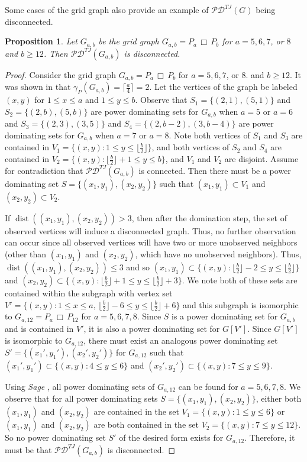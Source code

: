 \documentclass{article}
\def\red{\color{red}}
\numberwithin{figure}{section}   %
\newtheorem{prop}[thm]{Proposition}
\theoremstyle{definition}
\theoremstyle{definition}
\theoremstyle{definition}
\newcommand{\cp}{\, \Box\,}
\newcommand{\dist}{\operatorname{dist}}
\newcommand{\pd}{\gamma_P}
\newcommand{\te}{\mathscr{PD}^{TJ}}
\newcommand{\lh}[1]{{\textcolor{red}{[}\textcolor{red}{{LH: \em #1}]}}}
\begin{document}

Some cases of the grid graph also provide an example of $\te(G)$ being disconnected.

\begin{prop}
Let $G_{a,b}$ be the grid graph $G_{a,b}=P_{a}\cp P_{b}$ for $a=5,6,7$, or $8$ and $b\geq 12$. Then $\te(G_{a,b})$ is disconnected.
\end{prop}

\begin{proof} Consider the grid graph $G_{a,b}=P_{a}\cp P_{b}$ for $a=5,6,7$, or $8$.
and $b\ge 12$. It was shown in \cite{DH06} that $\pd(G_{a,b})=\lceil \frac{a}{4} \rceil=2$. Let the vertices of the graph be labeled $(x,y)$ for $1\leq x\leq a$ and $1\leq y\leq b$. Observe that $S_1=\{(2,1),(5,1)\}$ and $S_2=\{(2,b),(5,b)\}$ are power dominating sets for $G_{a,b}$ when $a=5$ or $a=6$ and $S_3=\{(2,3),(3,5)\}$ and $S_4=\{(2,b-2),(3,b-4)\}$ are power dominating sets for $G_{a,b}$ when $a=7$ or $a=8$. Note both vertices of $S_1$ and $S_3$ are contained in $V_1=\{(x,y) : 1\leq y\leq \lfloor \frac{b}{2}\rfloor\}$, and both vertices of $S_2$ and $S_4$ are contained in $V_2=\{(x,y) : \lfloor \frac{b}{2}\rfloor+1\leq y\leq b\}$, and $V_1$ and $V_2$ are disjoint. Assume for contradiction that $\te(G_{a,b})$ is connected. Then there must be a power dominating set $S=\{(x_1,y_1),(x_2,y_2)\}$ such that $(x_1,y_1)\subset V_1$ and $(x_2,y_2)\subset V_2$.

If $\dist((x_1,y_1),(x_2,y_2))>3$, then after the domination step, the set of observed vertices will induce a  disconnected graph. Thus, no further observation can occur since all observed vertices will have two or more unobserved neighbors (other than $(x_1,y_1)$ and $(x_2,y_2)$, which have no unobserved neighbors). Thus, $\dist((x_1,y_1),(x_2,y_2))\leq 3$ and so $(x_1,y_1)\subset \{(x,y) : \lfloor \frac{b}{2}\rfloor-2\leq y \leq \lfloor\frac{b}{2}\rfloor\}$ and $(x_2,y_2)\subset \{(x,y) : \lfloor \frac{b}{2}\rfloor+1\leq y \leq \lfloor\frac{b}{2}\rfloor+3\}$. We note both of these sets are contained within the subgraph with vertex set $V'=\{(x,y) : 1\leq x\leq a, \, \lfloor \frac{b}{2}\rfloor-6\leq y \leq \lfloor\frac{b}{2}\rfloor+6\}$ and this subgraph is isomorphic to $G_{a,12}=P_{a}\cp P_{12}$ for $a=5,6,7,8$. Since $S$ is a power dominating set for $G_{a,b}$ and is contained in $V'$, it is also a power dominating set for $G[V']$. Since $G[V']$ is isomorphic to $G_{a,12}$, there must exist an analogous power dominating set $S'=\{(x_1',y_1'),(x_2',y_2')\}$ for $G_{a,12}$ such that $(x_1',y_1')\subset \{(x,y) : 4\leq y \leq 6\}$ and $(x_2',y_2')\subset \{(x,y) : 7\leq y \leq 9\}$. 

Using {\it Sage} \cite{sage:pd-recon},
all power dominating sets of $G_{a,12}$ can be found for $a=5,6,7,8$. We observe that for all power dominating sets $S=\{(x_1,y_1),(x_2,y_2)\}$, either both $(x_1,y_1)$ and $(x_2,y_2)$ are contained in the set $V_1=\{(x,y) : 1\leq y\leq 6\}$ or $(x_1,y_1)$ and $(x_2,y_2)$ are both contained in the set $V_2=\{(x,y) : 7\leq y\leq 12\}$. So no power dominating set $S'$ of the desired form exists for $G_{a,12}$. Therefore, it must be that $\te(G_{a,b})$ is disconnected.
\end{proof}
\end{document}
